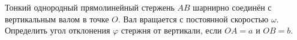 Тонкий однородный прямолинейный стержень $AB$
шарнирно соединён с вертикальным валом в точке $O$.
Вал вращается с постоянной скоростью $\omega$.
Определить угол отклонения $\varphi$ стержня от вертикали,
если $OA = a$ и $OB = b$.
